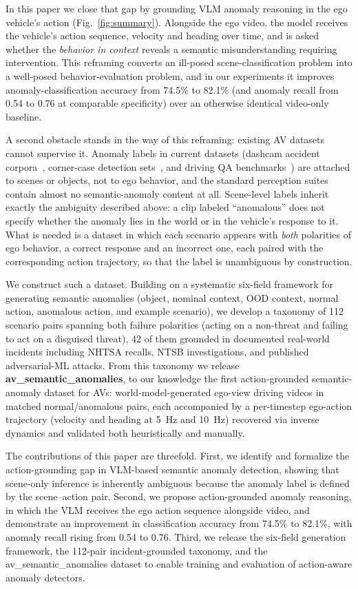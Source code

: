 \documentclass[conference]{IEEEtran}
\begin{document}
In this paper we close that gap by grounding VLM anomaly reasoning in the ego vehicle's action (Fig.~\ref{fig:summary}). Alongside the ego video, the model receives the vehicle's action sequence, velocity and heading over time, and is asked whether the \emph{behavior in context} reveals a semantic misunderstanding requiring intervention. This reframing converts an ill-posed scene-classification problem into a well-posed behavior-evaluation problem, and in our experiments it improves anomaly-classification accuracy from 74.5\% to 82.1\% (and anomaly recall from 0.54 to 0.76 at comparable specificity) over an otherwise identical video-only baseline.

A second obstacle stands in the way of this reframing: existing AV datasets cannot supervise it. Anomaly labels in current datasets (dashcam accident corpora~\cite{b7}, corner-case detection sets~\cite{b5}, and driving QA benchmarks~\cite{b16,b17}) are attached to scenes or objects, not to ego behavior, and the standard perception suites~\cite{b14} contain almost no semantic-anomaly content at all. Scene-level labels inherit exactly the ambiguity described above: a clip labeled ``anomalous'' does not specify whether the anomaly lies in the world or in the vehicle's response to it. What is needed is a dataset in which each scenario appears with \emph{both} polarities of ego behavior, a correct response and an incorrect one, each paired with the corresponding action trajectory, so that the label is unambiguous by construction.

We construct such a dataset. Building on a systematic six-field framework for generating semantic anomalies (object, nominal context, OOD context, normal action, anomalous action, and example scenario), we develop a taxonomy of 112 scenario pairs spanning both failure polarities (acting on a non-threat and failing to act on a disguised threat), 42 of them grounded in documented real-world incidents including NHTSA recalls, NTSB investigations, and published adversarial-ML attacks. From this taxonomy we release \textbf{av\_semantic\_anomalies}, to our knowledge the first action-grounded semantic-anomaly dataset for AVs: world-model-generated ego-view driving videos in matched normal/anomalous pairs, each accompanied by a per-timestep ego-action trajectory (velocity and heading at 5~Hz and 10~Hz) recovered via inverse dynamics and validated both heuristically and manually.

The contributions of this paper are threefold. First, we identify and formalize the action-grounding gap in VLM-based semantic anomaly detection, showing that scene-only inference is inherently ambiguous because the anomaly label is defined by the scene--action pair. Second, we propose action-grounded anomaly reasoning, in which the VLM receives the ego action sequence alongside video, and demonstrate an improvement in classification accuracy from 74.5\% to 82.1\%, with anomaly recall rising from 0.54 to 0.76. Third, we release the six-field generation framework, the 112-pair incident-grounded taxonomy, and the av\_semantic\_anomalies dataset to enable training and evaluation of action-aware anomaly detectors.
\end{document}
